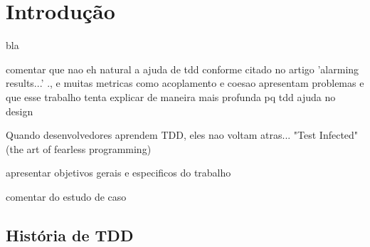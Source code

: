 \chapter{Introdução}
\label{cap:tdd-introducao}

bla

comentar que nao eh natural a ajuda de tdd conforme citado no artigo 'alarming results...' ., e muitas metricas como
acoplamento e coesao apresentam problemas
e que esse
trabalho tenta explicar de maneira mais profunda pq tdd ajuda no design

Quando desenvolvedores aprendem TDD, eles nao voltam atras... "Test Infected" (the art of fearless programming)

apresentar objetivos gerais e especificos do trabalho

comentar do estudo de caso

\section{História de TDD}